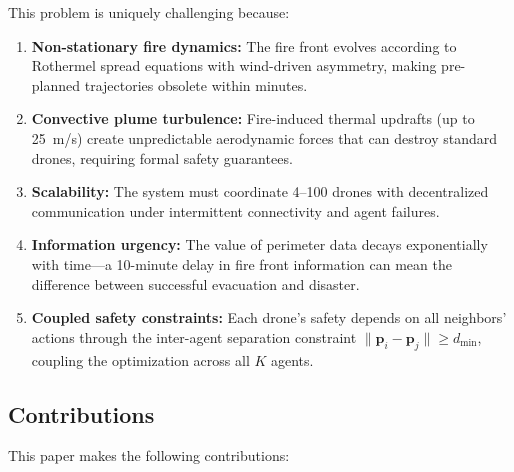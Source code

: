 \documentclass[12pt,a4paper]{article}
\DeclareRobustCommand{\vect}[1]{\bm{#1}}
\begin{document}
This problem is uniquely challenging because:

\begin{enumerate}[leftmargin=*]
    \item \textbf{Non-stationary fire dynamics:} The fire front evolves according to Rothermel spread equations with wind-driven asymmetry, making pre-planned trajectories obsolete within minutes.
    \item \textbf{Convective plume turbulence:} Fire-induced thermal updrafts (up to 25~m/s) create unpredictable aerodynamic forces that can destroy standard drones, requiring formal safety guarantees.
    \item \textbf{Scalability:} The system must coordinate 4--100 drones with decentralized communication under intermittent connectivity and agent failures.
    \item \textbf{Information urgency:} The value of perimeter data decays exponentially with time---a 10-minute delay in fire front information can mean the difference between successful evacuation and disaster.
    \item \textbf{Coupled safety constraints:} Each drone's safety depends on all neighbors' actions through the inter-agent separation constraint $\|\vect{p}_i - \vect{p}_j\| \geq d_{\min}$, coupling the optimization across all $K$ agents.
\end{enumerate}

\subsection{Contributions}
\label{sec:contributions}

This paper makes the following contributions:
\end{document}
